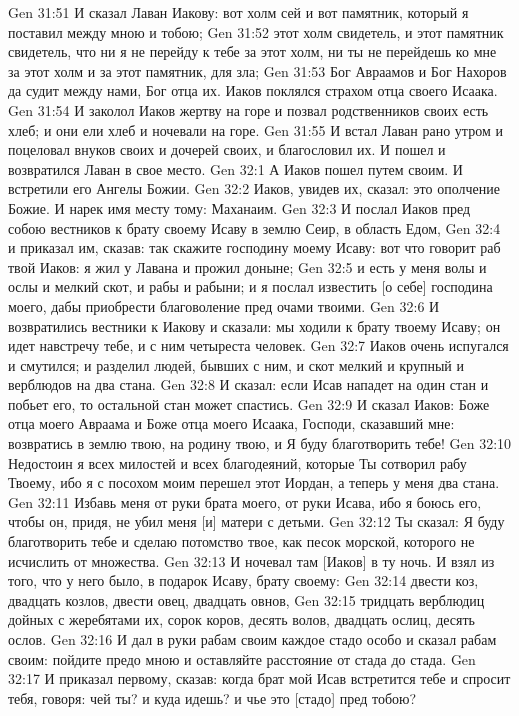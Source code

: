 Gen 31:51  И сказал Лаван Иакову: вот холм сей и вот памятник, который я поставил между мною и тобою;
Gen 31:52  этот холм свидетель, и этот памятник свидетель, что ни я не перейду к тебе за этот холм, ни ты не перейдешь ко мне за этот холм и за этот памятник, для зла;
Gen 31:53  Бог Авраамов и Бог Нахоров да судит между нами, Бог отца их. Иаков поклялся страхом отца своего Исаака.
Gen 31:54  И заколол Иаков жертву на горе и позвал родственников своих есть хлеб; и они ели хлеб и ночевали на горе.
Gen 31:55  И встал Лаван рано утром и поцеловал внуков своих и дочерей своих, и благословил их. И пошел и возвратился Лаван в свое место.
Gen 32:1  А Иаков пошел путем своим. И встретили его Ангелы Божии.
Gen 32:2  Иаков, увидев их, сказал: это ополчение Божие. И нарек имя месту тому: Маханаим.
Gen 32:3  И послал Иаков пред собою вестников к брату своему Исаву в землю Сеир, в область Едом,
Gen 32:4  и приказал им, сказав: так скажите господину моему Исаву: вот что говорит раб твой Иаков: я жил у Лавана и прожил доныне;
Gen 32:5  и есть у меня волы и ослы и мелкий скот, и рабы и рабыни; и я послал известить [о себе] господина моего, дабы приобрести благоволение пред очами твоими.
Gen 32:6  И возвратились вестники к Иакову и сказали: мы ходили к брату твоему Исаву; он идет навстречу тебе, и с ним четыреста человек.
Gen 32:7  Иаков очень испугался и смутился; и разделил людей, бывших с ним, и скот мелкий и крупный и верблюдов на два стана.
Gen 32:8  И сказал: если Исав нападет на один стан и побьет его, то остальной стан может спастись.
Gen 32:9  И сказал Иаков: Боже отца моего Авраама и Боже отца моего Исаака, Господи, сказавший мне: возвратись в землю твою, на родину твою, и Я буду благотворить тебе!
Gen 32:10  Недостоин я всех милостей и всех благодеяний, которые Ты сотворил рабу Твоему, ибо я с посохом моим перешел этот Иордан, а теперь у меня два стана.
Gen 32:11  Избавь меня от руки брата моего, от руки Исава, ибо я боюсь его, чтобы он, придя, не убил меня [и] матери с детьми.
Gen 32:12  Ты сказал: Я буду благотворить тебе и сделаю потомство твое, как песок морской, которого не исчислить от множества.
Gen 32:13  И ночевал там [Иаков] в ту ночь. И взял из того, что у него было, в подарок Исаву, брату своему:
Gen 32:14  двести коз, двадцать козлов, двести овец, двадцать овнов,
Gen 32:15  тридцать верблюдиц дойных с жеребятами их, сорок коров, десять волов, двадцать ослиц, десять ослов.
Gen 32:16  И дал в руки рабам своим каждое стадо особо и сказал рабам своим: пойдите предо мною и оставляйте расстояние от стада до стада.
Gen 32:17  И приказал первому, сказав: когда брат мой Исав встретится тебе и спросит тебя, говоря: чей ты? и куда идешь? и чье это [стадо] пред тобою?
